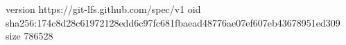 version https://git-lfs.github.com/spec/v1
oid sha256:174c8d28c61972128edd6c97fc681fbaead48776ae07ef607eb43678951ed309
size 786528
